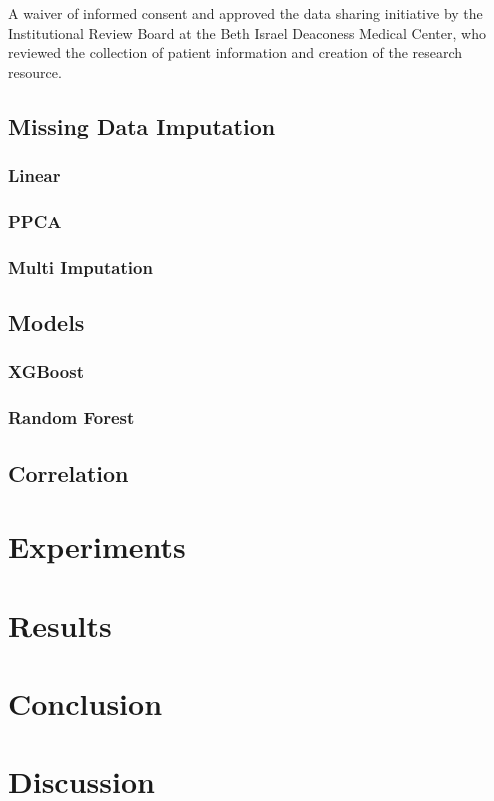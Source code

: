 \documentclass[12pt,a4paper,english
]{tunithesis}
\begin{document}
A waiver of informed consent and approved the data sharing initiative by the Institutional Review Board at the Beth Israel Deaconess Medical Center, who reviewed the collection of patient information and creation of the research resource. \parencite{johnson2023}


\section{Missing Data Imputation}
\subsection{Linear}
\subsection{PPCA}
\subsection{Multi Imputation}
\section{Models}
\subsection{XGBoost}
\subsection{Random Forest}
\section{Correlation}

\chapter{Experiments}
\label{ch:experiment}

\chapter{Results}
\chapter{Conclusion}
\chapter{Discussion}
\end{document}
